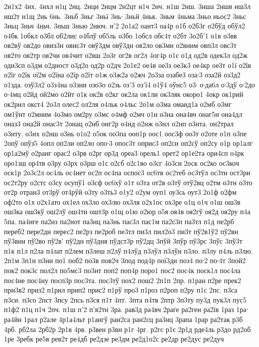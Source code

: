 {2н1х2
4нх.
4нхл
н1ц
2нц.
2нци
2нцм
2н2цт
н1ч
2нч.
н1ш
2нш.
3нша
2ншв
нш3л
нш2т
н1щ
2нь
6нь.
3ньб
3ньг
3ньї
3нь∙
3ньй
4ньк.
3ньм
4ньма
3ньо
ньос2
3ньс
3ньц
3ньч
4ньч.
3ньш
3нью
2нюч.
н'2
2о1а2
оант3
оа4р
о1б
о2б3г
о2бўд
обўл2
о4бк
1обкл
о3бл
об2лис
о4блў
об5ль
о3бо
1обсл
обс4т
о2бт
3о2б'1
о1в
о3вв
ов2вў
ов2до
овиз3н
овис3т
овў3дм
овў3дн
ов2ло
ов3ми
о2вним
овп3л
овс3т
ов2то
ов2тр
ов2чи
ов4чит
о2вш
2о3г
ог2в
ог2л
4ог4р
о1є
о1д
од2в
одек3л
од2ж
оди3сп
о3дм
о2дност
о3д2о
од2р
о2дч
2о1е2
ое4в
ое3з
ое3к3
ое4кр
ое3т
о1ї
о2їв
о2їг
о2їк
ої2м
о2їна
о2їр
о2їт
о1ж
о3ж2а
о2жч
2о3за
озабе3
оза∙3
оза2й
оз3д2
о1зда.
озў3л2
о3з4на
о3зни
озо3о
о2зь
оз'3
оз'ї4
о1ў4
оўнс5
о3∙
о∙да6л
о∙3дў
о∙2до
о∙4мц
о2йд
ой2мо
о2йт
о1к
ок2в
о2кг
ок2ла
ок1ли
ок3ляк
окоро1
4окр
ок1рий
ок2рил
окст4
2о3л
олес2
ол2ля
о4льк
о4льс
2о1м
о3ма
оманд1а
о2мб
о3мг
ом1ўнт
о2мним
4о3мо
ом2ру
о3мс
о4мф
о2мч
о1н
о3на
она4вч
онаг5н
она4дл
оназ3
она2й
онас3т
2онац
о2нб
онг2р
о4нд
о2нж
о3нл
о2нп
о3нта.
он2трал
о3нту.
о3нх
о2нш
о3нь
о1о2
о5ок
оо3па
ооп1р
оос1
оос3ф
оо3т
о2оте
о1п
о3пе
2опў
опўз5
4опл
оп2ли
оп2ло
опо∙3
опос3т
оприс3
оп2си
оп2сў
оп2су
о1р
ор1алг
ор1а2мў
о2ранг
орас2
о3рв
о2рг
ор3д
ореа3
орель1
орет2
ор1е2та
ори4сп
о4рк
оро1зш
ор4тв
о3ру
о3рх
о3рш
о1с
о2сб
о2с1во
о3сг
4о3си
2оск
ос2ко
ос3коч
оск1р
2о3с2л
ос4ль
ос4нет
ос2п
ос4па
оспос3
ос6тв
ос2теб
ос3тўл
ос3тн
ост3ри
ос2т2ру
о2стс
о3су
осупў1
о3сф
ос6хў
о1т
о3та
от2в
о3тў
отў2вц
о2тм
о3тн
о3то
от2р
отран3
от3рў
от4рўй
о3ту
о3ть3
о1у2
о2ум
оуп1
оу3сь
оут3
2о1ф
о2фм
оф2то
о1х
о2х1ато
ох1ел
ох3ло
ох3лю
ох3ля
о2х1ос
ох3ре
о1ц
о1ч
о1ш
ош3в
ош3ка
ош3кў
ош2лў
ош4ти
ошт3р
о1щ
о1ю
о2юр
о5я
оя4в
оя2гў
оя2д
оя2ру
п4а
5па.
па4нге
па2нз
па2нот
па3нц
па3нь
пас3л
пас1м
па2с3п
па3тл
п1д
пе2рб
переб2
пере2дн
перес2
пе2рз
пе2роб
пе3тл
пи3л
пил2о3
пи3т
пў2в1ў2
пў2вн
пў3вни
пў2во
пў2в'
пў2дн
пў3дня
пўдст3р
пў2дц
3пўй
3пўр
пў3рс
3пўс
3пў3т
п1к
п1л
п2ла
п4лат
п2лем
п3леш
п2лў
п4лўд
п3лўл
п3лўн
п3ло.
п3лу
п4ль
п3лю.
2п1м
3п1н
п3ни
по1
поб2
по3в
пов2ч
3под
под4р
пої3ди
поз4
по∙2
по∙4т
3пой2
пок2
пок3с
пол2л
по5мс3
по3нт
поп2
поп4р
поро1
пос2
пос4к
поск1л
пос4ла
пос4не
пос4ну
посп3р
пос3та.
пос3тў
пох2
пош2
2п1п
2пр.
п1ран
п2ре
прек2
при3в2
приз2
п1рил
прип2
прис2
п1рў
про3
п1роз
п2роп
п2ру
п1с
2пс.
п3са
п3си.
п3со
2пст
3псу
2псь
п3ся
п1т
4пт.
3пта
п4тв
2птр
3п3ту
пу3д
пук3л
пус5
п1ф2
п1ц
п1ч
2пч.
п1ш
п'2
п'я2тн
3ра.
рав3д
ра4вч
2раге
ра2ген
ра2їв
1раз
1ра∙
ра4йн
1рал
р2але
4р1а4льт
р1ангў
ран2са
ран2сц
ра3нц
3рапа
1рар
ра2так
р3б
4рб.
рб2ла
2рб2р
2р1в
4рв.
р3вен
р3вн
р1г
4рг.
р2гс
р1є
2р1д
рде4ль
р3до
рд2об
1ре
3ребк
ре5в
рев2т
ре4дб
ре2дзе
ре3дм
ре2д1о2с
ре2др
ре2дус
ре2дуч
}
